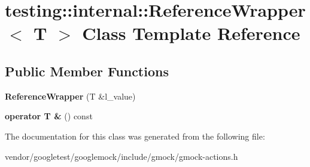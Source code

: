 \hypertarget{classtesting_1_1internal_1_1ReferenceWrapper}{}\section{testing\+:\+:internal\+:\+:Reference\+Wrapper$<$ T $>$ Class Template Reference}
\label{classtesting_1_1internal_1_1ReferenceWrapper}
\subsection*{Public Member Functions}
\begin{DoxyCompactItemize}
\item 
{\bfseries Reference\+Wrapper} (T \&l\+\_\+value)\hypertarget{classtesting_1_1internal_1_1ReferenceWrapper_ad33597ffc478c3af9190d1a288a76d39}{}\label{classtesting_1_1internal_1_1ReferenceWrapper_ad33597ffc478c3af9190d1a288a76d39}

\item 
{\bfseries operator T \&} () const \hypertarget{classtesting_1_1internal_1_1ReferenceWrapper_ac9a45f88ba592f05b0c0c90103812872}{}\label{classtesting_1_1internal_1_1ReferenceWrapper_ac9a45f88ba592f05b0c0c90103812872}

\end{DoxyCompactItemize}


The documentation for this class was generated from the following file\+:\begin{DoxyCompactItemize}
\item 
vendor/googletest/googlemock/include/gmock/gmock-\/actions.\+h\end{DoxyCompactItemize}
